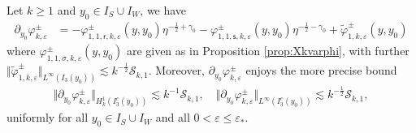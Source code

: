 \documentclass[10pt,a4paper]{amsart}
\newcommand\cS{{\mathcal S}}
\newcommand{\ep}{\varepsilon}
\newcommand{\sr}{{\mathsf{r}}}
\newcommand{\s}{{\mathsf{s}}}
\begin{document}
\begin{proposition}\label{prop:Xkpynotvarphi}
Let $k\geq 1$ and $y_0\in I_S\cup I_W$, we have
\begin{equation}\label{eq:decomXkpynotvarphi}
\begin{split}
\partial_{y_0}\varphi_{k,\ep}^\pm &= -\varphi_{1,1,\sr,k,\ep}^\pm(y,y_0) \eta^{-\frac12+\gamma_0} -\varphi_{1,1,\s,k,\ep}^\pm(y,y_0) \eta^{-\frac12-\gamma_0} + \widetilde\varphi_{1,k,\ep}^\pm(y,y_0)
\end{split}
\end{equation}
where $\varphi_{1,1,\sigma,k,\ep}^\pm(y,y_0)$ are given as in Proposition \ref{prop:Xkvarphi}, with further $\Vert \widetilde\varphi_{1,k,\ep}^\pm \Vert_{L^\infty(I_3(y_0))} \lesssim  k^{-\frac12}\cS_{k,1}$. Moreover, $\partial_{y_0}\varphi_{k,\ep}^\pm$ enjoys the more precise bound
\begin{align*}
\Vert \partial_{y_0}\varphi_{k,\ep}^\pm \Vert_{H_k^1(I_3^c(y_0))} \lesssim  k^{-1}\cS_{k,1}, \quad \Vert \partial_{y_0}\varphi_{k,\ep}^\pm \Vert_{L^\infty(I_3^c(y_0))} \lesssim k^{-\frac12}\cS_{k,1}, 
\end{align*}
uniformly for all $y_0\in I_S\cup I_{W}$ and all $0 < \ep\leq \ep_*$.
\end{proposition}
\end{document}
